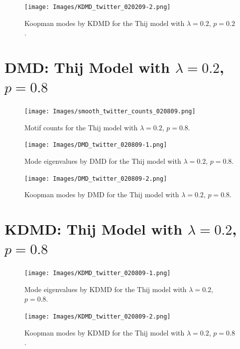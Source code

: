 \begin{figure}
    \texttt{[image: Images/KDMD\_twitter\_020209-2.png]}
    \centering
    \caption{Koopman modes by KDMD for the Thij model
    with $\lambda=0.2$, $p=0.2$.}
\end{figure}

\clearpage
\FloatBarrier
\section{DMD: Thij Model with $\lambda=0.2$, $p=0.8$}
\begin{figure}
    \texttt{[image: Images/smooth\_twitter\_counts\_020809.png]}
    \centering
    \caption{Motif counts for the Thij model with $\lambda=0.2$, $p=0.8$.}
    \label{fig:pthij0208}
\end{figure}

\clearpage
\begin{figure}
    \texttt{[image: Images/DMD\_twitter\_020809-1.png]}
    \centering
    \caption{Mode eigenvalues by DMD for the Thij model
    with $\lambda=0.2$, $p=0.8$.}
    \label{fig:dmd02081}
\end{figure}

\begin{figure}
    \texttt{[image: Images/DMD\_twitter\_020809-2.png]}
    \centering
    \caption{Koopman modes by DMD for the Thij model
    with $\lambda=0.2$, $p=0.8$.}
    \label{fig:dmd02082}
\end{figure}

\clearpage
\section{KDMD: Thij Model with $\lambda=0.2$, $p=0.8$}


\begin{figure}
    \texttt{[image: Images/KDMD\_twitter\_020809-1.png]}
    \centering
    \caption{Mode eigenvalues by KDMD for the Thij model
    with $\lambda=0.2$, $p=0.8$.}
    \label{fig:kdmd02083}
\end{figure}

\begin{figure}
    \texttt{[image: Images/KDMD\_twitter\_020809-2.png]}
    \centering
    \caption{ Koopman modes by KDMD for the Thij model
    with $\lambda=0.2$, $p=0.8$.}
    \label{fig:kdmd02084}
\end{figure}

\FloatBarrier

\clearpage

